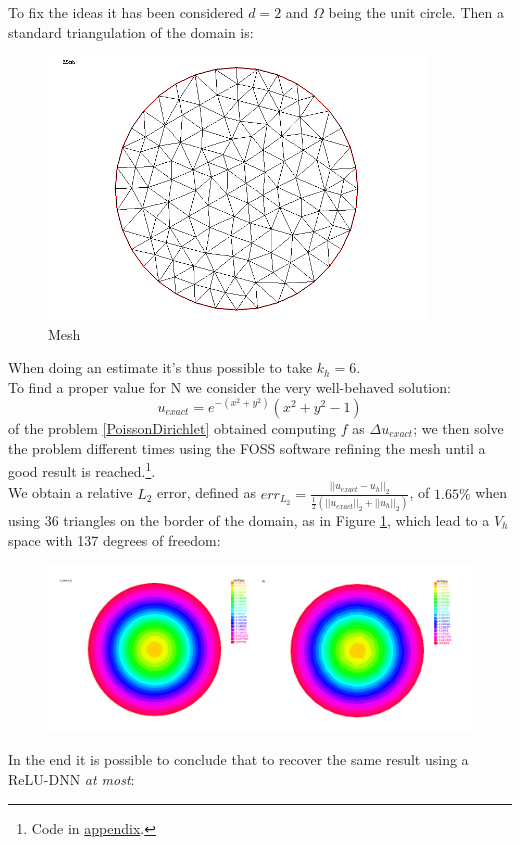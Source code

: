 \documentclass[12pt, a4paper]{report}
\theoremstyle{definition}
\begin{document}
To fix the ideas it has been considered $d=2$ and $\Omega$ being the unit circle. Then a standard triangulation of the domain is:
\begin{figure}[H]
	\centering
	\includegraphics[width=10cm]{img/triangulation.png}
	\caption{Mesh}\label{k_h}
\end{figure}
\noindent When doing an estimate it's thus possible to take $k_h=6$.\\
To find a proper value for N we consider the very well-behaved solution:
\[u_{exact}=e^{-(x^2+y^2)}(x^2+y^2-1)\]
of the problem \eqref{PoissonDirichlet} obtained computing $f$ as $\Delta u_{exact}$; we then solve the problem different times using the FOSS software \cite{freefem++} refining the mesh until a good result is reached.\footnote{Code in \hyperref[appendix]{appendix}.}. \\
We obtain a relative $L_2$ error, defined as $err_{L_2} = \frac{||u_{exact}-u_h||_2}{ \frac{1}{2} (||u_{exact}||_2+||u_h||_2) }  $, of $1.65\%$ when using 36 triangles on the border of the domain, as in Figure \ref{k_h}, which lead to a $V_h$ space with 137 degrees of freedom:
\begin{figure}[H]
	\centering
	\includegraphics[width=14cm]{img/u2.png}
	\caption{}\label{u2}
\end{figure}
\noindent In the end it is possible to conclude that to recover the same result using a ReLU-DNN \textit{at most}:
\end{document}
